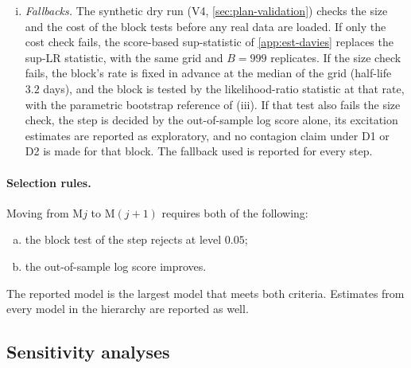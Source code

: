 \begin{enumerate}[(i)]
  identified through the other entries of its block. If every other entry of the block is
  estimated as zero under the entry's null, that entry is tested with the sup-LR procedure
  of (i)--(iii) instead. All entry-level tests in the accepted blocks form one family, and
  Holm's procedure \citep{holm1979} controls its family-wise error rate at $0.05$. Decision
  rules D1 and D2 refer to these Holm-adjusted tests.
  \item \emph{Fallbacks.} The synthetic dry run (V4, \cref{sec:plan-validation}) checks the
  size and the cost of the block tests before any real data are loaded. If only the cost
  check fails, the score-based sup-statistic of \cref{app:est-davies} replaces the sup-LR
  statistic, with the same grid and $B=999$ replicates. If the size check fails, the block's
  rate is fixed in advance at the median of the grid (half-life $3.2$ days), and the block
  is tested by the likelihood-ratio statistic at that rate, with the parametric bootstrap
  reference of (iii). If that test also fails the size check, the step is decided by the
  out-of-sample log score alone, its excitation estimates are reported as exploratory, and
  no contagion claim under D1 or D2 is made for that block. The fallback used is reported
  for every step.
\end{enumerate}

\paragraph{Selection rules.} Moving from $\mathrm{M}j$ to $\mathrm{M}(j{+}1)$ requires both
of the following:
\begin{enumerate}[(a)]
  \item the block test of the step rejects at level $0.05$;
  \item the out-of-sample log score improves.
\end{enumerate}
The reported model is the largest model that meets both criteria. Estimates from every
model in the hierarchy are reported as well.

\subsection{Sensitivity analyses}\label{sec:plan-sens}

